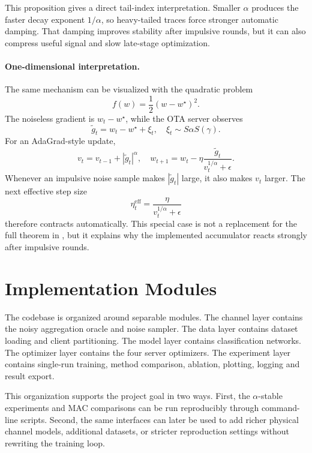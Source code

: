 This proposition gives a direct tail-index interpretation. Smaller
$\alpha$ produces the faster decay exponent $1/\alpha$, so heavy-tailed
traces force stronger automatic damping. That damping improves stability
after impulsive rounds, but it can also compress useful signal and slow
late-stage optimization.

\paragraph{One-dimensional interpretation.}
The same mechanism can be visualized with the quadratic problem
\begin{equation}
    f(w)=\frac{1}{2}(w-w^\star)^2.
\end{equation}
The noiseless gradient is $w_t-w^\star$, while the OTA server observes
\begin{equation}
    \tilde{g}_t = w_t-w^\star+\xi_t,
    \quad \xi_t \sim S\alpha S(\gamma).
\end{equation}
For an AdaGrad-style update,
\begin{equation}
    v_t = v_{t-1}+|\tilde{g}_t|^\alpha,
    \quad
    w_{t+1}=w_t-\eta\frac{\tilde{g}_t}{v_t^{1/\alpha}+\epsilon}.
\end{equation}
Whenever an impulsive noise sample makes $|\tilde{g}_t|$ large, it also
makes $v_t$ larger. The next effective step size
\begin{equation}
    \eta_t^{\mathrm{eff}} =
    \frac{\eta}{v_t^{1/\alpha}+\epsilon}
\end{equation}
therefore contracts automatically. This special case is not a replacement
for the full theorem in \cite{wang2024adaptive}, but it explains why the
implemented accumulator reacts strongly after impulsive rounds.

\section{Implementation Modules}
The codebase is organized around separable modules. The channel layer
contains the noisy aggregation oracle and noise sampler. The data layer
contains dataset loading and client partitioning. The model layer contains
classification networks. The optimizer layer contains the four server
optimizers. The experiment layer contains single-run training, method
comparison, ablation, plotting, logging and result export.

This organization supports the project goal in two ways. First, the
$\alpha$-stable experiments and MAC comparisons can be run reproducibly through
command-line scripts. Second, the same interfaces can later be used to add
richer physical channel models, additional datasets, or stricter reproduction
settings without rewriting the training loop.
